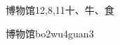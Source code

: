 \begin{entry}{博物馆}{12,8,11}{⼗、⽜、⾷}
  \begin{phonetics}{博物馆}{bo2wu4guan3}
  \end{phonetics}
\end{entry}
